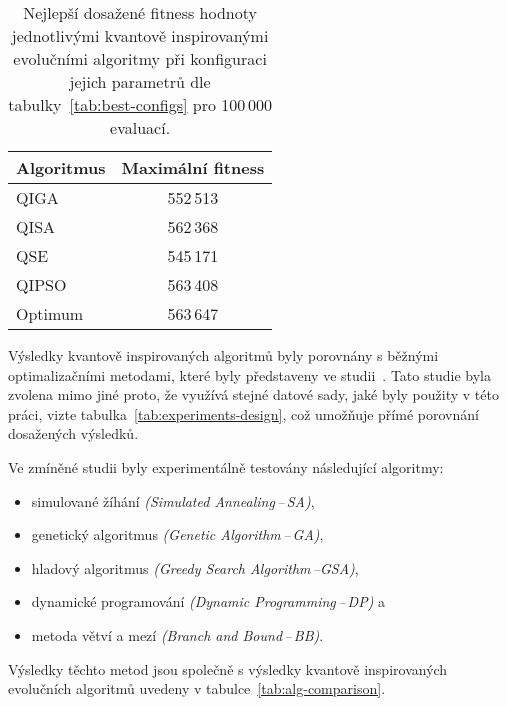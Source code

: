 \begin{table}[ht]
    \centering
    \begin{tabular}{l c}
        \toprule
        \textbf{Algoritmus} & \textbf{Maximální fitness} \\
        \midrule
        QIGA    & 552\,513 \\[1ex]
        QISA    & 562\,368 \\[1ex]
        QSE     & 545\,171 \\[1ex]
        QIPSO   & 563\,408 \\
        \midrule
        Optimum & 563\,647 \\
        \bottomrule
    \end{tabular}
    \caption{Nejlepší dosažené fitness hodnoty jednotlivými kvantově inspirovanými evolučními algoritmy při konfiguraci jejich parametrů dle tabulky~\ref{tab:best-configs} pro 100\,000 evaluací.}
    \label{tab:max-fitness-10000}
\end{table}

Výsledky kvantově inspirovaných algoritmů byly porovnány s běžnými optimalizačními metodami, které byly představeny ve studii~\cite{compare}.  
Tato studie byla zvolena mimo jiné proto, že využívá stejné datové sady, jaké byly použity v této práci, vizte tabulka~\ref{tab:experiments-design}, což umožňuje přímé porovnání dosažených výsledků.

Ve zmíněné studii byly experimentálně testovány následující algoritmy:
\begin{itemize}
    \item simulované žíhání \emph{(Simulated Annealing\,--\,SA)},
    \item genetický algoritmus \emph{(Genetic Algorithm\,--\,GA)},
    \item hladový algoritmus \emph{(Greedy Search Algorithm\,--GSA)},
    \item dynamické programování \emph{(Dynamic Programming\,--\,DP)} a 
    \item metoda větví a mezí \emph{(Branch and Bound\,--\,BB)}.
\end{itemize}
Výsledky těchto metod jsou společně s výsledky kvantově inspirovaných evolučních algoritmů uvedeny v tabulce~\ref{tab:alg-comparison}.

